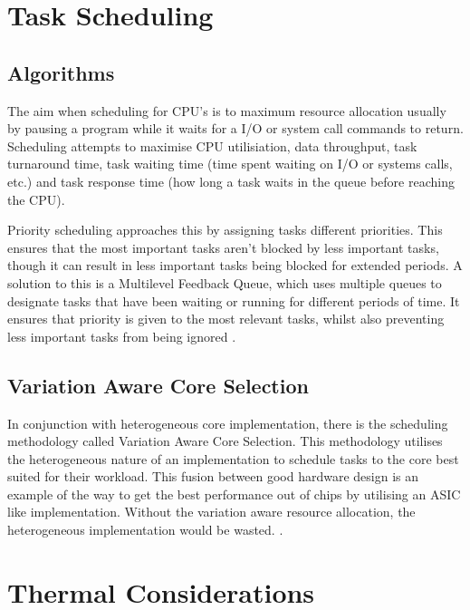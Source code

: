 	\section{Task Scheduling}
		
		\subsection{Algorithms}
			The aim when scheduling for CPU's is to maximum resource allocation usually by pausing a program while it waits for a I/O or system call commands to return. Scheduling attempts to maximise CPU utilisiation, data throughput, task turnaround time, task waiting time (time spent waiting on I/O or systems calls, etc.) and task response time (how long a task waits in the queue before reaching the CPU).
			
			Priority scheduling approaches this by assigning tasks different priorities. This ensures that the most important tasks aren't blocked by less important tasks, though it can result in less important tasks being blocked for extended periods. A solution to this is a Multilevel Feedback Queue, which uses multiple queues to designate tasks that have been waiting or running for different periods of time. It ensures that priority is given to the most relevant tasks, whilst also preventing less important tasks from being ignored \cite{CPUScheduling}.
		
		\subsection{Variation Aware Core Selection}
		 	In conjunction with heterogeneous core implementation, there is the scheduling methodology called Variation Aware Core Selection. This methodology utilises the heterogeneous nature of an implementation to schedule tasks to the core best suited for their workload. This fusion between good hardware design is an example of the way to get the best performance out of chips by utilising an ASIC like implementation. Without the variation aware resource allocation, the heterogeneous implementation would be wasted. \cite{HeterogenousCoreDesign}.
			
		
	
	\section{Thermal Considerations}
